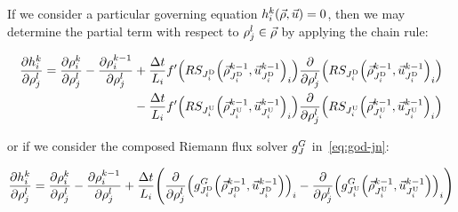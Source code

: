If we consider a particular governing equation $\syseq_{\link}^{\tind}\left(\state,\control\right)=0$,
then we may determine the partial term with respect to $\rho_{j}^{l}\in\vec{\rho}$
by applying the chain rule:

\begin{align}
\pfrac{\syseq_{\link}^{\tind}}{\discrete jl}=\pfrac{\discrete{\link}{\tind}}{\discrete jl}-\pfrac{\discrete{\link}{\tind-1}}{\discrete jl} & +\frac{\Delta t}{L_{i}}f'\left(\RS_{\jdown{\link}}\left(\juncstate{\jdown{\link}}{\tind-1},\junccon{\jdown{\link}}{\tind-1}\right)_{\link}\right)\pfrac{}{\discrete jl}\left(\RS_{\jdown{\link}}\left(\juncstate{\jdown{\link}}{\tind-1},\junccon{\jdown{\link}}{\tind-1}\right)_{\link}\right)\label{eq:dhdufull}\\
 & -\frac{\Delta t}{L_{i}}f'\left(\RS_{\jup{\link}}\left(\juncstate{\jup{\link}}{\tind-1},\junccon{\jup{\link}}{\tind-1}\right)_{\link}\right)\pfrac{}{\discrete jl}\left(\RS_{\jup{\link}}\left(\juncstate{\jup{\link}}{\tind-1},\junccon{\jup{\link}}{\tind-1}\right)_{\link}\right)\nonumber 
\end{align}


or if we consider the composed Riemann flux solver $g^{G}_{J}$ in~\eqref{eq:god-jn}:

\begin{equation}
\pfrac{\syseq_{\link}^{\tind}}{\discrete jl}=\pfrac{\discrete{\link}{\tind}}{\discrete jl}-\pfrac{\discrete{\link}{\tind-1}}{\discrete jl}+\frac{\Delta t}{L_{i}}\left(\pfrac{}{\discrete jl}\left(\god_{\jdown{\link}}\left(\juncstate{\jdown{\link}}{\tind-1},\junccon{\jdown{\link}}{\tind-1}\right)\right)_{\link}-\pfrac{}{\discrete jl}\left(\god_{\jup{\link}}\left(\juncstate{\jup{\link}}{\tind-1},\junccon{\jup{\link}}{\tind-1}\right)\right)_{\link}\right)\label{eq:dhdugod}
\end{equation}


